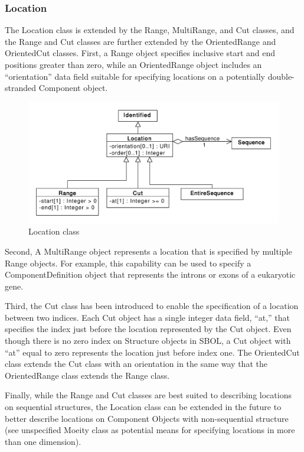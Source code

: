 \documentclass[draftspec]{sbmlpkgspec}
\begin{document}
\subsubsection{Location}
\label{sec:Location}
The Location class is extended by the Range, MultiRange, and Cut classes, and the Range and Cut classes are further extended by the OrientedRange and OrientedCut classes. First, a Range object specifies inclusive start and end positions greater than zero, while an OrientedRange object includes an “orientation” data field suitable for specifying locations on a potentially double-stranded Component object.

\begin{figure}[ht]
\begin{center}
\includegraphics[scale=0.6]{uml/location}
\caption[]{Location class}
\label{uml:location}
\end{center}
\end{figure}

Second, A MultiRange object represents a location that is specified by multiple Range objects. For example, this capability can be used to specify a ComponentDefinition object that represents the introns or exons of a eukaryotic gene.

Third, the Cut class has been introduced to enable the specification of a location between two indices. Each Cut object has a single integer data field, “at,” that specifies the index just before the location represented by the Cut object. Even though there is no zero index on Structure objects in SBOL, a Cut object with “at” equal to zero represents the location just before index one. The OrientedCut class extends the Cut class with an orientation in the same way that the OrientedRange class extends the Range class.

Finally, while the Range and Cut classes are best suited to describing locations on sequential structures, the Location class can be extended in the future to better describe locations on Component Objects with non-sequential structure (see unspecified Moeity class as potential means for specifying locations in more than one dimension).
\end{document}

